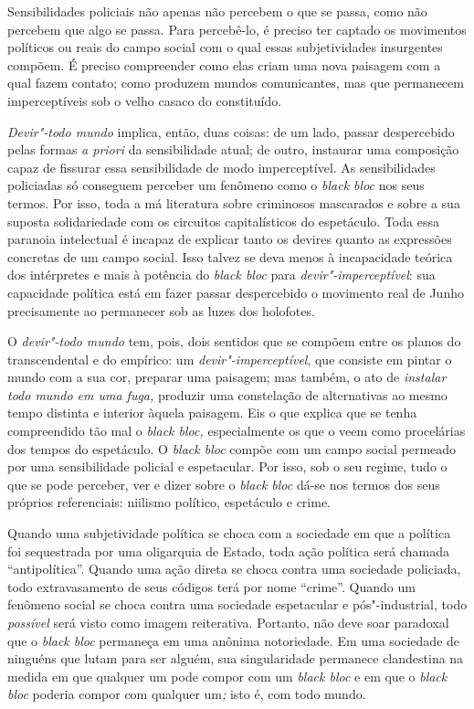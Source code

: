 Sensibilidades policiais não apenas não percebem o que se passa, como
não percebem que algo se passa. Para percebê-lo, é preciso ter captado
os movimentos políticos ou reais do campo social com o qual essas
subjetividades insurgentes compõem. É preciso compreender como elas
criam uma nova paisagem com a qual fazem contato; como produzem mundos
comunicantes, mas que permanecem imperceptíveis sob o velho casaco do
constituído.

\emph{Devir"-todo mundo} implica, então, duas coisas: de um lado, passar
despercebido pelas formas \emph{a priori }da sensibilidade atual; de
outro, instaurar uma composição capaz de fissurar essa sensibilidade de
modo imperceptível. As sensibilidades policiadas só conseguem perceber
um fenômeno como o \emph{black bloc} nos seus termos. Por isso, toda a
má literatura sobre criminosos mascarados e sobre a sua suposta
solidariedade com os circuitos capitalísticos do espetáculo. Toda essa
paranoia intelectual é incapaz de explicar tanto os devires quanto as
expressões concretas de um campo social. Isso talvez se deva menos à
incapacidade teórica dos intérpretes e mais à potência do \emph{black
bloc }para \emph{devir"-imperceptível}: sua capacidade política está em
fazer passar despercebido o movimento real de Junho precisamente ao
permanecer sob as luzes dos holofotes.

O \emph{devir"-todo mundo} tem, pois, dois sentidos que se compõem entre
os planos do transcendental e do empírico: um
\emph{devir"-imperceptível}, que consiste em pintar o mundo com a sua
cor, preparar uma paisagem; mas também, o ato de \emph{instalar todo
mundo em uma fuga, }produzir uma constelação de alternativas ao mesmo
tempo distinta e interior àquela paisagem. Eis o que explica que se
tenha compreendido tão mal o \emph{black bloc, }especialmente os que o
veem como procelárias dos tempos do espetáculo. O \emph{black bloc}
compõe com um campo social permeado por uma sensibilidade policial e
espetacular. Por isso, sob o seu regime, tudo o que se pode perceber,
ver e dizer sobre o \emph{black bloc} dá-se nos termos dos seus próprios
referenciais: niilismo político, espetáculo e crime.

Quando uma subjetividade política se choca com a sociedade em que a
política foi sequestrada por uma oligarquia de Estado, toda ação
política será chamada ``antipolítica''. Quando uma ação direta se choca
contra uma sociedade policiada, todo extravasamento de seus códigos terá
por nome ``crime''. Quando um fenômeno social se choca contra uma
sociedade espetacular e pós"-industrial, todo\emph{ possível }será visto
como imagem reiterativa. Portanto, não deve soar paradoxal que o
\emph{black bloc }permaneça em uma anônima notoriedade. Em uma sociedade
de ninguéns que lutam para ser alguém, sua singularidade permanece
clandestina na medida em que qualquer um pode compor com um \emph{black
bloc }e em que o \emph{black bloc }poderia compor com qualquer um\emph{;
}isto é, com todo mundo.

